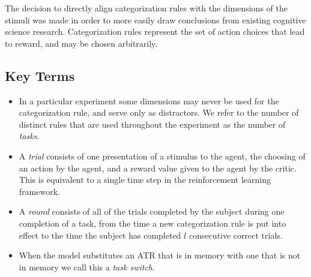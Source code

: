 \documentclass[10pt,letterpaper]{article}
\begin{document}
The decision to directly align categorization rules with the dimensions of the stimuli was made in order to more easily draw conclusions from existing cognitive science research. Categorization rules represent the set of action choices that lead to reward, and may be chosen arbitrarily.

\subsection{Key Terms}

\begin{itemize}
\item In a particular experiment some dimensions may never be used for the categorization rule, and serve only as distractors. We refer to the number of distinct rules that are used throughout the experiment as the number of \textit{tasks}. 
\item A \textit{trial} consists of one presentation of a stimulus to the agent, the choosing of an action by the agent, and a reward value given to the agent by the critic. This is equivalent to a single time step in the reinforcement learning framework. 
\item A \textit{round} consists of all of the trials completed by the subject during one completion of a task, from the time a new categorization rule is put into effect to the time the subject has completed $l$ consecutive correct trials. 
\item When the model substitutes an ATR that is in memory with one that is not in memory we call this a \textit{task switch}. 
\end{itemize}
\end{document}
